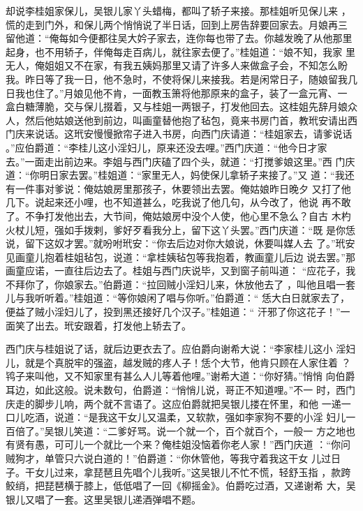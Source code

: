 却说李桂姐家保儿，吴银儿家丫头蜡梅，都叫了轿子来接。那桂姐听见保儿来
，慌的走到门外，和保儿两个悄悄说了半日话，回到上房告辞要回家去。月娘再三
留他道：“俺每如今便都往吴大妗子家去，连你每也带了去。你越发晚了从他那里
起身，也不用轿子，伴俺每走百病儿，就往家去便了。”桂姐道：“娘不知，我家
里无人，俺姐姐又不在家，有我五姨妈那里又请了许多人来做盒子会，不知怎么盼
我。昨日等了我一日，他不急时，不使将保儿来接我。若是闲常日子，随娘留我几
日我也住了。”月娘见他不肯，一面教玉箫将他那原来的盒子，装了一盒元宵、一
盒白糖薄脆，交与保儿掇着，又与桂姐一两银子，打发他回去。这桂姐先辞月娘众
人，然后他姑娘送他到前边，叫画童替他抱了毡包，竟来书房门首，教玳安请出西
门庆来说话。这玳安慢慢掀帘子进入书房，向西门庆请道：“桂姐家去，请爹说话
。”应伯爵道：“李桂儿这小淫妇儿，原来还没去哩。”西门庆道：“他今日才家
去。”一面走出前边来。李姐与西门庆磕了四个头，就道：“打搅爹娘这里。”西
门庆道：“你明日家去罢。”桂姐道：“家里无人，妈使保儿拿轿子来接了。”又
道：“我还有一件事对爹说：俺姑娘房里那孩子，休要领出去罢。俺姑娘昨日晚夕
又打了他几下。说起来还小哩，也不知道甚么，吃我说了他几句，从今改了，他说
再不敢了。不争打发他出去，大节间，俺姑娘房中没个人使，他心里不急么？自古
木杓火杖儿短，强如手拨剌，爹好歹看我分上，留下这丫头罢。”西门庆道：“既
是你恁说，留下这奴才罢。”就吩咐玳安：“你去后边对你大娘说，休要叫媒人去
了。”玳安见画童儿抱着桂姐毡包，说道：“拿桂姨毡包等我抱着，教画童儿后边
说去罢。”那画童应诺，一直往后边去了。桂姐与西门庆说毕，又到窗子前叫道：
“应花子，我不拜你了，你娘家去。”伯爵道：“拉回贼小淫妇儿来，休放他去了
，叫他且唱一套儿与我听听着。”桂姐道：“等你娘闲了唱与你听。”伯爵道：“
恁大白日就家去了，便益了贼小淫妇儿了，投到黑还接好几个汉子。”桂姐道：“
汗邪了你这花子！”一面笑了出去。玳安跟着，打发他上轿去了。

西门庆与桂姐说了话，就后边更衣去了。应伯爵向谢希大说：“李家桂儿这小
淫妇儿，就是个真脱牢的强盗，越发贼的疼人子！恁个大节，他肯只顾在人家住着
？鸨子来叫他，又不知家里有甚么人儿等着他哩。”谢希大道：“你好猜。”悄悄
向伯爵耳边，如此这般。说未数句，伯爵道：“悄悄儿说，哥正不知道哩。”不一
时，西门庆走的脚步儿响，两个就不言语了。这应伯爵就把吴银儿搂在怀里，和他
一递一口儿吃酒，说道：“是我这干女儿又温柔，又软款，强如李家狗不要的小淫
妇儿一百倍了。”吴银儿笑道：“二爹好骂。说一个就一个，百个就百个，一般一
方之地也有贤有愚，可可儿一个就比一个来？俺桂姐没恼着你老人家！”西门庆道
：“你问贼狗才，单管只六说白道的！”伯爵道：“你休管他，等我守着我这干女
儿过日子。干女儿过来，拿琵琶且先唱个儿我听。”这吴银儿不忙不慌，轻舒玉指
，款跨鲛绡，把琵琶横于膝上，低低唱了一回《柳摇金》。伯爵吃过酒，又递谢希
大，吴银儿又唱了一套。这里吴银儿递酒弹唱不题。

